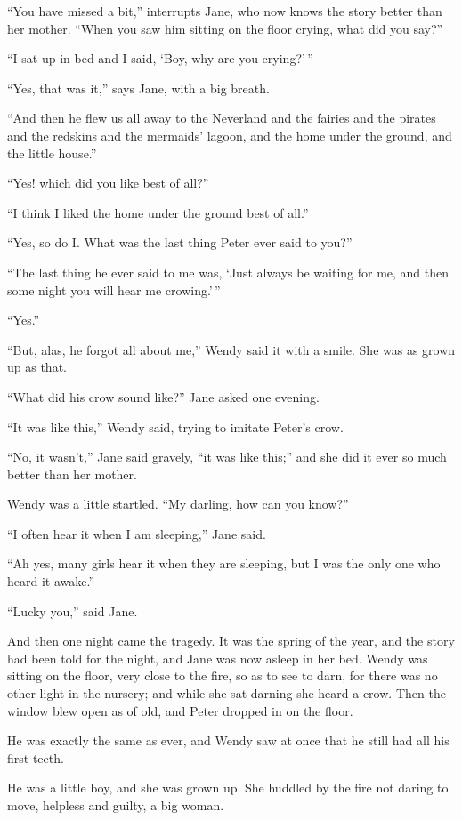 ``You have missed a bit,'' interrupts Jane, who now knows the story
better than her mother. ``When you saw him sitting on the floor crying,
what did you say?''

``I sat up in bed and I said, `Boy, why are you crying?'\,''

``Yes, that was it,'' says Jane, with a big breath.

``And then he flew us all away to the Neverland and the fairies and the
pirates and the redskins and the mermaids' lagoon, and the home under
the ground, and the little house.''

``Yes! which did you like best of all?''

``I think I liked the home under the ground best of all.''

``Yes, so do I. What was the last thing Peter ever said to you?''

``The last thing he ever said to me was, `Just always be waiting for me,
and then some night you will hear me crowing.'\,''

``Yes.''

``But, alas, he forgot all about me,'' Wendy said it with a smile. She
was as grown up as that.

``What did his crow sound like?'' Jane asked one evening.

``It was like this,'' Wendy said, trying to imitate Peter's crow.

``No, it wasn't,'' Jane said gravely, ``it was like this;'' and she did it
ever so much better than her mother.

Wendy was a little startled. ``My darling, how can you know?''

``I often hear it when I am sleeping,'' Jane said.

``Ah yes, many girls hear it when they are sleeping, but I was the only
one who heard it awake.''

``Lucky you,'' said Jane.

And then one night came the tragedy. It was the spring of the year, and
the story had been told for the night, and Jane was now asleep in her
bed. Wendy was sitting on the floor, very close to the fire, so as to
see to darn, for there was no other light in the nursery; and while she
sat darning she heard a crow. Then the window blew open as of old, and
Peter dropped in on the floor.

He was exactly the same as ever, and Wendy saw at once that he still
had all his first teeth.

He was a little boy, and she was grown up. She huddled by the fire not
daring to move, helpless and guilty, a big woman.

